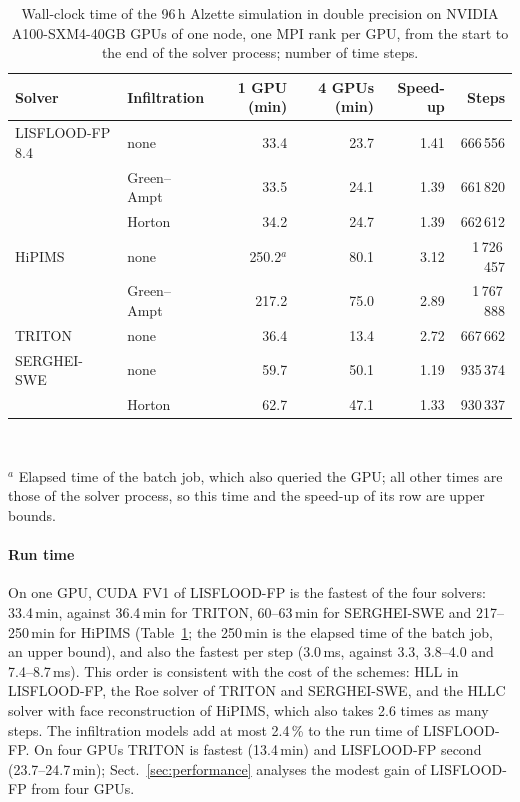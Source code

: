 \documentclass[draft,linenumbers]{agujournal2025}
\begin{document}
\begin{table}[t]
\caption{Wall-clock time of the 96\,h Alzette simulation in double
precision on NVIDIA A100-SXM4-40GB GPUs of one node, one MPI rank per GPU,
from the start to the end of the solver process; number of time steps.}
\label{tab:modeltimes}
\centering\small
\begin{tabular}{@{}llrrrr@{}}
\toprule
Solver & Infiltration & 1 GPU (min) & 4 GPUs (min) & Speed-up & Steps \\
\midrule
LISFLOOD-FP 8.4 & none & 33.4 & 23.7 & 1.41 & 666\,556 \\
 & Green--Ampt & 33.5 & 24.1 & 1.39 & 661\,820 \\
 & Horton & 34.2 & 24.7 & 1.39 & 662\,612 \\
HiPIMS & none & 250.2$^{a}$ & 80.1 & 3.12 & 1\,726\,457 \\
 & Green--Ampt & 217.2 & 75.0 & 2.89 & 1\,767\,888 \\
TRITON & none & 36.4 & 13.4 & 2.72 & 667\,662 \\
SERGHEI-SWE & none & 59.7 & 50.1 & 1.19 & 935\,374 \\
 & Horton & 62.7 & 47.1 & 1.33 & 930\,337 \\
\bottomrule
\end{tabular}
\\[2pt]\begin{minipage}{\textwidth}\footnotesize $^{a}$ Elapsed time of the batch job, which also
queried the GPU; all other times are those of the solver process, so this
time and the speed-up of its row are upper bounds.\end{minipage}
\end{table}

\paragraph{Run time} On one GPU, CUDA FV1 of LISFLOOD-FP is the fastest of
the four solvers: 33.4\,min, against 36.4\,min for TRITON, 60--63\,min for SERGHEI-SWE
and 217--250\,min for HiPIMS (Table~\ref{tab:modeltimes}; the 250\,min is
the elapsed time of the batch job, an upper bound), and also the
fastest per step (3.0\,ms, against 3.3, 3.8--4.0 and 7.4--8.7\,ms). This
order is consistent with the cost of the schemes: HLL in LISFLOOD-FP, the
Roe solver of TRITON and SERGHEI-SWE, and the HLLC solver with face
reconstruction of HiPIMS, which also takes 2.6 times as many steps. The
infiltration models add at most 2.4\,\% to the run time of LISFLOOD-FP. On four GPUs TRITON is fastest
(13.4\,min) and LISFLOOD-FP second (23.7--24.7\,min); Sect.~\ref{sec:performance}
analyses the modest gain of LISFLOOD-FP from four GPUs.
\end{document}

